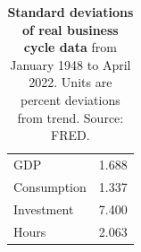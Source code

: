 \begin{table}[h] \caption{\label{tab009_rbc_data_std_devs} \textbf{Standard deviations of real business cycle data} from January 1948 to April 2022. Units are percent deviations from trend. {\tiny Source: FRED}.}
\begin{center}\hspace*{-.5cm}

\begin{tabular}{lr}
\toprule
GDP         &  1.688 \\
Consumption &  1.337 \\
Investment  &  7.400 \\
Hours       &  2.063 \\
\bottomrule
\end{tabular}
\end{center}
\end{table}